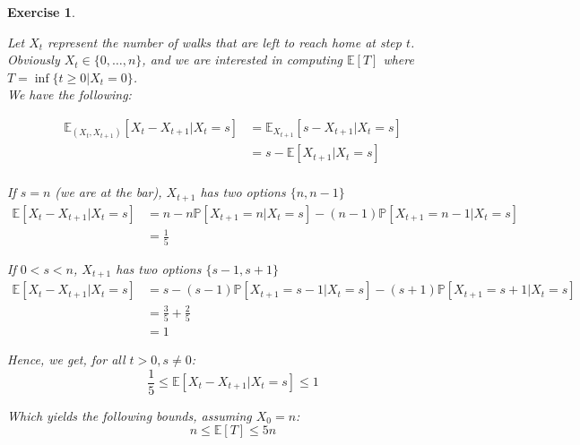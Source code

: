 \documentclass{article}
\newtheorem{exo}{Exercise}
\def\P{\mathbb{P}}
\def\E{\mathbb{E}}
\begin{document}
\begin{exo}{\ \\}

Let $X_t$ represent the number of walks that are left to reach home at step $t$. Obviously $X_t \in \{0, \dots, n\}$, and we are interested in computing $\E[T]$ where $T = \inf\{t \geq 0 | X_t = 0 \}$. \\

We have the following:

\begin{align*}
    \E_{(X_t,X_{t+1})}[X_t - X_{t+1}| X_t=s]  
    &= \E_{X_{t+1}}[s- X_{t+1}| X_t=s]  \\
    &= s - \E[X_{t+1}| X_t=s]  \\
\end{align*}

If $s=n$ (we are at the bar), $X_{t+1}$ has two options $\{n, n-1\}$
\begin{align*}
    \E[X_t-X_{t+1} | X_t = s] 
    &= n - n\P[X_{t+1}= n|X_t=s] - (n-1)\P[X_{t+1}=n-1|X_t=s] \\
    &= \frac{1}{5}
\end{align*}


If $0<s<n$, $X_{t+1}$ has two options $\{s-1, s+1\}$
\begin{align*}
    \E[X_t-X_{t+1} | X_t = s] 
    &= s - (s-1)\P[X_{t+1}= s-1|X_t=s] - (s+1)\P[X_{t+1}=s+1|X_t=s] \\
    &= \frac{3}{5} + \frac{2}{5} \\
    &= 1
\end{align*}

Hence, we get, for all $t>0, s \neq 0$:
\[ \frac{1}{5} \leq \E[X_t-X_{t+1} | X_t = s]  \leq 1 \]

Which yields the following bounds, assuming $X_0 = n$:
\[ n \leq \E[T] \leq 5n \]
\end{exo}
\end{document}
